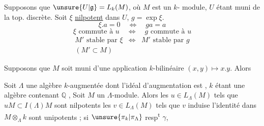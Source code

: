 
Supposons que $\unsure{U|\mathfrak g}=L_k(M)$, où $M$ est un $k$-
module, $U$ étant muni de la top. discrète.
Soit $\xi$ \uline{nilpotent} dans $U$, $g=\exp\xi$.
\[
\xi.a=0\quad\Longleftrightarrow\quad ga=a
\]
\[
\xi\text{ commute à }u\quad\Longleftrightarrow\quad g\text{ commute à }u
\]
\[
\begin{array}{ccc}
M'\text{ stable par }\xi&\Longleftrightarrow&M'\text{ stable par }g\\
(M'\subset M)&&
\end{array}
\]

Supposons que $M$ soit muni d'une
application $k$-bilinéaire $(x,y)\longmapsto x.y$. Alors
\diagram{\[
\begin{array}{ccc}
\xi(x.y)=(\xi x)y+x(\xi y)&\Longleftrightarrow&g(x.y)=(gx)(g.y)\\
\uline{\text{dérivations}}&&\uline{\text{automorphismes}}\\
\text{nilpotentes}&&\text{unipotents}
\end{array}
\]}


Soit $\Lambda$ une algèbre $k$-augmentée dont l'idéal
d'augmentation est 
, $k$ étant une
algèbre contenant $\mathbb Q$ ,
Soit $M$ un $\Lambda$-module.
Alors les $u\in L_\Lambda(M)$ tels que $uM\subset I(\Lambda)M$
sont nilpotents 
 les
$v\in L_\Lambda(M)$ tels que $v$ induise l'identité
dans $M\otimes_\Lambda k$ sont unipotents ; si 
 $\unsure{\pi_k|\pi_\Lambda}$ resp\textsuperscript{t} $\gamma$,

